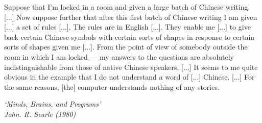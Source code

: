 \setlength{\epigraphwidth}{0.9\textwidth}
\epigraph{Suppose that I’m locked in a room and given a large batch of Chinese writing. [...]  Now suppose further that after this first batch of Chinese writing I am given [...] a set of rules [...]. The rules are in English [...]. They enable me [...] to give back certain Chinese symbols with certain sorts of shapes in response to certain sorts of shapes given me [...]. From the point of view of somebody outside the room in which I am locked — my answers to the questions are absolutely indistinguishable from those of native Chinese speakers. [...] It seems to me quite obvious in the example that I do not understand a word of [...] Chinese. [...] For the same reasons, [the] computer understands nothing of any stories.}{\textit{‘Minds, Brains, and Programs’\\John. R. Searle (1980)}}

\vspace{1em}

